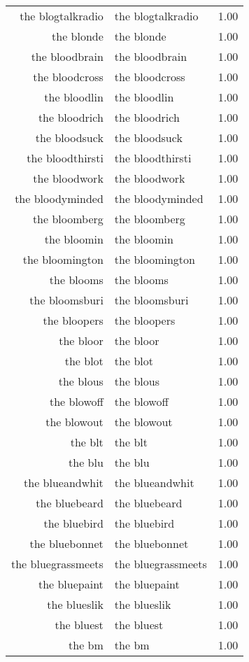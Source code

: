 \begin{table}[ht]
\begin{tabular}{rlr}
  the blogtalkradio & the blogtalkradio & 1.00 \\ 
  the blonde & the blonde & 1.00 \\ 
  the bloodbrain & the bloodbrain & 1.00 \\ 
  the bloodcross & the bloodcross & 1.00 \\ 
  the bloodlin & the bloodlin & 1.00 \\ 
  the bloodrich & the bloodrich & 1.00 \\ 
  the bloodsuck & the bloodsuck & 1.00 \\ 
  the bloodthirsti & the bloodthirsti & 1.00 \\ 
  the bloodwork & the bloodwork & 1.00 \\ 
  the bloodyminded & the bloodyminded & 1.00 \\ 
  the bloomberg & the bloomberg & 1.00 \\ 
  the bloomin & the bloomin & 1.00 \\ 
  the bloomington & the bloomington & 1.00 \\ 
  the blooms & the blooms & 1.00 \\ 
  the bloomsburi & the bloomsburi & 1.00 \\ 
  the bloopers & the bloopers & 1.00 \\ 
  the bloor & the bloor & 1.00 \\ 
  the blot & the blot & 1.00 \\ 
  the blous & the blous & 1.00 \\ 
  the blowoff & the blowoff & 1.00 \\ 
  the blowout & the blowout & 1.00 \\ 
  the blt & the blt & 1.00 \\ 
  the blu & the blu & 1.00 \\ 
  the blueandwhit & the blueandwhit & 1.00 \\ 
  the bluebeard & the bluebeard & 1.00 \\ 
  the bluebird & the bluebird & 1.00 \\ 
  the bluebonnet & the bluebonnet & 1.00 \\ 
  the bluegrassmeets & the bluegrassmeets & 1.00 \\ 
  the bluepaint & the bluepaint & 1.00 \\ 
  the blueslik & the blueslik & 1.00 \\ 
  the bluest & the bluest & 1.00 \\ 
  the bm & the bm & 1.00 \\ 

\end{tabular}
\end{table}
